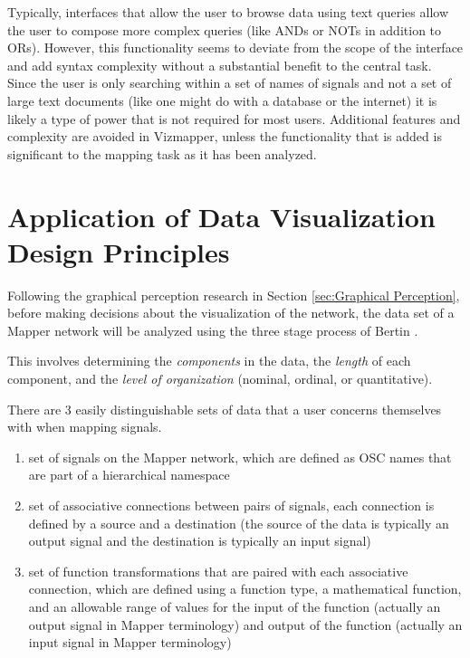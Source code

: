 Typically, interfaces that allow the user to browse data using text queries allow the user to compose more complex queries (like ANDs or NOTs in addition to ORs). However, this functionality seems to deviate from the scope of the interface and add syntax complexity without a substantial benefit to the central task. Since the user is only searching within a set of names of signals and not a set of large text documents (like one might do with a database or the internet) it is likely a type of power that is not required for most users. Additional features and complexity are avoided in Vizmapper, unless the functionality that is added is significant to the mapping task as it has been analyzed.

\section{Application of Data Visualization Design Principles}

Following the graphical perception research in Section \ref{sec:Graphical Perception}, before making decisions about the visualization of the network, the data set of a Mapper network will be analyzed using the three stage process of Bertin \cite{semiology1983}.

This involves determining the \emph{components} in the data, the \emph{length} of each component, and the \emph{level of organization} (nominal, ordinal, or quantitative).

There are 3 easily distinguishable sets of data that a user concerns themselves with when mapping signals.

\begin{enumerate}
\item set of signals on the Mapper network, which are defined as OSC names that are part of a hierarchical namespace
\item set of associative connections between pairs of signals, each connection is defined by a source and a destination (the source of the data is typically an output signal and the destination is typically an input signal)
\item set of function transformations that are paired with each associative connection, which are defined using a function type, a mathematical function, and an allowable range of values for the input of the function (actually an output signal in Mapper terminology) and output of the function (actually an input signal in Mapper terminology)
\end{enumerate}

